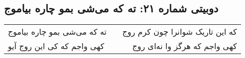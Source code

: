 \begin{center}
\section*{دوبیتی شماره ۲۱: ته که می‌شی بمو چاره بیاموج}
\label{sec:021}
\begin{longtable}{l p{0.5cm} r}
ته که می‌شی بمو چاره بیاموج
&&
که این تاریک شوانرا چون کرم روج
\\
کهی واجم که کی این روج آیو
&&
کهی واجم که هرگز وا نه‌ای روج
\\
\end{longtable}
\end{center}
